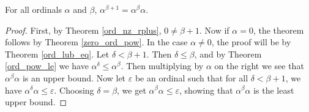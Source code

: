 \documentclass[../../math.tex]{subfiles}
\begin{document}
\begin{theorem} \label{ord_pow_plus_one}
    For all ordinals $\alpha$ and $\beta$, $\alpha ^ {\beta + 1} = \alpha ^
    \beta \alpha$.
\end{theorem}
\begin{proof}
    First, by Theorem \ref{ord_nz_rplus}, $0 \neq \beta + 1$.  Now if $\alpha =
    0$, the theorem follows by Theorem \ref{zero_ord_pow}.  In the case $\alpha
    \neq 0$, the proof will be by Theorem \ref{ord_lub_eq}.  Let $\delta < \beta
    + 1$.  Then $\delta \leq \beta$, and by Theorem \ref{ord_pow_le} we have
    $\alpha ^ \delta \leq \alpha ^ \beta$.  Then multiplying by $\alpha$ on the
    right we see that $\alpha ^ \beta \alpha$ is an upper bound.  Now let
    $\varepsilon$ be an ordinal such that for all $\delta < \beta + 1$, we have
    $\alpha ^ \delta \alpha \leq \varepsilon$.  Choosing $\delta = \beta$, we
    get $\alpha ^ \beta \alpha \leq \varepsilon$, showing that $\alpha ^ \beta
    \alpha$ is the least upper bound.
\end{proof}
\end{document}
